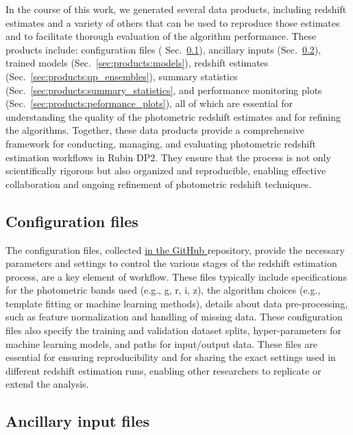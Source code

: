 In the course of this work, we generated several data products, including redshift estimates and a variety of others that can be used to reproduce those estimates and to facilitate thorough evaluation of the algorithm performance.  These products include: configuration files ( Sec.~\ref{sec:products:configuration}), ancillary inputs (Sec.~\ref{sec:products:algo_files}), trained models (Sec.~\ref{sec:products:models}), redshift estimates (Sec.~\ref{sec:products:qp_ensembles}), summary statistics (Sec.~\ref{sec:products:summary_statistics}, and performance monitoring plots (Sec.~\ref{sec:products:peformance_plots}), all of which are essential for understanding the quality of the photometric redshift estimates and for refining the algorithms.   Together, these data products provide a comprehensive framework for conducting, managing, and evaluating photometric redshift estimation workflows in Rubin DP2.  They ensure that the process is not only scientifically rigorous but also organized and reproducible, enabling effective collaboration and ongoing refinement of photometric redshift techniques.


\subsection{Configuration files}
\label{sec:products:configuration}

The configuration files, collected \href{https://github.com/lsstdesc/rail_project_config}{in the GitHub } repository, provide the necessary parameters and settings to control the various stages of the redshift estimation process, are a key element of  workflow.  These files typically include specifications for the photometric bands used (e.g., g, r, i, z), the algorithm choices (e.g., template fitting or machine learning methods), details about data pre-processing, such as feature normalization and handling of missing data.  These configuration files also specify the training and validation dataset splits, hyper-parameters for machine learning models, and paths for input/output data.  These files are essential for ensuring reproducibility and for sharing the exact settings used in different redshift estimation runs, enabling other researchers to replicate or extend the analysis.


\subsection{Ancillary input files}
\label{sec:products:algo_files}

